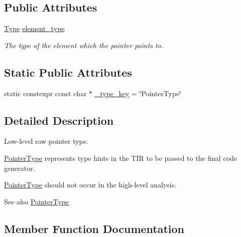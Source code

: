 \subsection*{Public Attributes}
\begin{DoxyCompactItemize}
\item 
\hyperlink{classtvm_1_1Type}{Type} \hyperlink{classtvm_1_1PointerTypeNode_a3ce20495711da0c9f83f02df466ae8a0}{element\+\_\+type}
\begin{DoxyCompactList}\small\item\em The type of the element which the pointer points to. \end{DoxyCompactList}\end{DoxyCompactItemize}
\subsection*{Static Public Attributes}
\begin{DoxyCompactItemize}
\item 
static constexpr const char $\ast$ \hyperlink{classtvm_1_1PointerTypeNode_a68e8650dd528b7207174fce399d45bc3}{\+\_\+type\+\_\+key} = \char`\"{}Pointer\+Type\char`\"{}
\end{DoxyCompactItemize}


\subsection{Detailed Description}
Low-\/level raw pointer type. 

\hyperlink{classtvm_1_1PointerType}{Pointer\+Type} represents type hints in the T\+IR to be passed to the final code generator.

\hyperlink{classtvm_1_1PointerType}{Pointer\+Type} should not occur in the high-\/level analysis.

\begin{DoxySeeAlso}{See also}
\hyperlink{classtvm_1_1PointerType}{Pointer\+Type} 
\end{DoxySeeAlso}


\subsection{Member Function Documentation}
